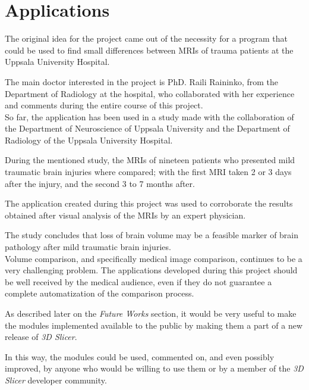 \chapter{Applications}

The original idea for the project came out of the necessity for a
program that could be used to find small differences between MRIs of
trauma patients at the Uppsala University Hospital.

The main doctor interested in the project is PhD. Raili Raininko, from
the Department of Radiology at the hospital, who collaborated with her
experience and comments during the entire course of this project.\\

So far, the application has been used in a study made with the
collaboration of the Department of Neuroscience of Uppsala University
and the Department of Radiology of the Uppsala University Hospital.

During the mentioned study, the MRIs of nineteen patients who
presented mild traumatic brain injuries where compared; with the first
MRI taken 2 or 3 days after the injury, and the second 3 to 7 months
after.

The application created during this project was used to corroborate
the results obtained after visual analysis of the MRIs by an expert
physician. 

The study concludes that loss of brain volume may be a
feasible marker of brain pathology after mild traumatic brain
injuries.\\

Volume comparison, and specifically medical image comparison,
continues to be a very challenging problem. The applications developed
during this project should be well received by the medical audience,
even if they do not guarantee a complete automatization of the
comparison process.

As described later on the \textit{Future Works} section, it would be
very useful to make the modules implemented available to the public by
making them a part of a new release of \textit{3D Slicer}.

In this way, the modules could be used, commented on, and even
possibly improved, by anyone who would be willing to use them or by a
member of the \textit{3D Slicer} developer community.


